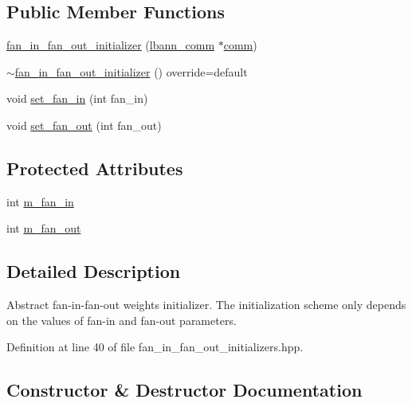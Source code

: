 \subsection*{Public Member Functions}
\begin{DoxyCompactItemize}
\item 
\hyperlink{classlbann_1_1fan__in__fan__out__initializer_a3a3811af11b1a70a57af846ae2cdf668}{fan\+\_\+in\+\_\+fan\+\_\+out\+\_\+initializer} (\hyperlink{classlbann_1_1lbann__comm}{lbann\+\_\+comm} $\ast$\hyperlink{file__io_8cpp_ab048c6f9fcbcfaa57ce68b00263dbebe}{comm})
\item 
\hyperlink{classlbann_1_1fan__in__fan__out__initializer_ab351750e3f776aa6748053f29d5d031c}{$\sim$fan\+\_\+in\+\_\+fan\+\_\+out\+\_\+initializer} () override=default
\item 
void \hyperlink{classlbann_1_1fan__in__fan__out__initializer_a6da7299bd2fb6aa1b549125fc62ffafc}{set\+\_\+fan\+\_\+in} (int fan\+\_\+in)
\item 
void \hyperlink{classlbann_1_1fan__in__fan__out__initializer_a4464e05d66e938058a01be04a2495452}{set\+\_\+fan\+\_\+out} (int fan\+\_\+out)
\end{DoxyCompactItemize}
\subsection*{Protected Attributes}
\begin{DoxyCompactItemize}
\item 
int \hyperlink{classlbann_1_1fan__in__fan__out__initializer_aea6639db271d9050f0a2e4f8c8dfa6cd}{m\+\_\+fan\+\_\+in}
\item 
int \hyperlink{classlbann_1_1fan__in__fan__out__initializer_ac67d275ab8574780525d2af59b738338}{m\+\_\+fan\+\_\+out}
\end{DoxyCompactItemize}


\subsection{Detailed Description}
Abstract fan-\/in-\/fan-\/out weights initializer. The initialization scheme only depends on the values of fan-\/in and fan-\/out parameters. 

Definition at line 40 of file fan\+\_\+in\+\_\+fan\+\_\+out\+\_\+initializers.\+hpp.



\subsection{Constructor \& Destructor Documentation}
\mbox{\label{classlbann_1_1fan__in__fan__out__initializer_a3a3811af11b1a70a57af846ae2cdf668}} 
